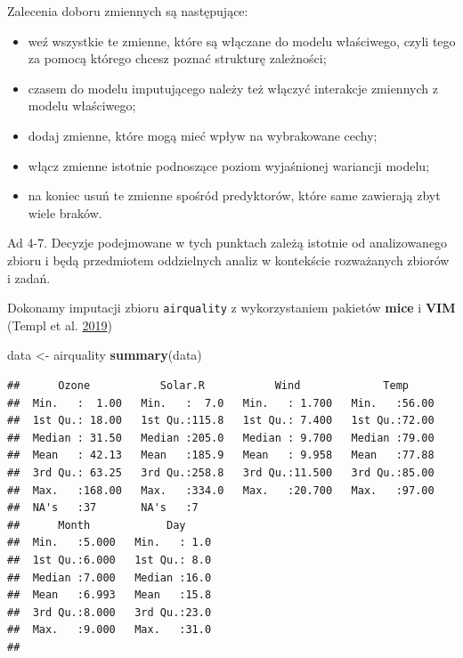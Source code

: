 \documentclass[]{book}
\newenvironment{Shaded}{\begin{snugshade}}{\end{snugshade}}
\newcommand{\KeywordTok}[1]{\textcolor[rgb]{0.13,0.29,0.53}{\textbf{#1}}}
\newcommand{\NormalTok}[1]{#1}
\newcommand{\StringTok}[1]{\textcolor[rgb]{0.31,0.60,0.02}{#1}}
\providecommand{\tightlist}{%
  \setlength{\itemsep}{0pt}\setlength{\parskip}{0pt}}
\theoremstyle{plain}
\theoremstyle{definition}
\theoremstyle{definition}
\theoremstyle{definition}
\theoremstyle{definition}
\theoremstyle{remark}
\let\BeginKnitrBlock\begin \let\EndKnitrBlock\end
\begin{document}
Zalecenia doboru zmiennych są następujące:

\begin{itemize}
\tightlist
\item
  weź wszystkie te zmienne, które są włączane do modelu właściwego, czyli tego za pomocą którego chcesz poznać strukturę zależności;
\item
  czasem do modelu imputującego należy też włączyć interakcje zmiennych z modelu właściwego;
\item
  dodaj zmienne, które mogą mieć wpływ na wybrakowane cechy;
\item
  włącz zmienne istotnie podnoszące poziom wyjaśnionej wariancji modelu;
\item
  na koniec usuń te zmienne spośród predyktorów, które same zawierają zbyt wiele braków.
\end{itemize}

Ad 4-7. Decyzje podejmowane w tych punktach zależą istotnie od analizowanego zbioru i będą przedmiotem oddzielnych analiz w kontekście rozważanych zbiorów i zadań.

\BeginKnitrBlock{example}
\protect\hypertarget{exm:przyk21}{}{\label{exm:przyk21} }Dokonamy imputacji zbioru \texttt{airquality} z wykorzystaniem pakietów \textbf{mice} i \textbf{VIM} (Templ et al. \protect\hyperlink{ref-R-VIM}{2019})
\EndKnitrBlock{example}

\begin{Shaded}
\begin{Highlighting}[]
\NormalTok{data <-}\StringTok{ }\NormalTok{airquality}
\KeywordTok{summary}\NormalTok{(data)}
\end{Highlighting}
\end{Shaded}

\begin{verbatim}
##      Ozone           Solar.R           Wind             Temp      
##  Min.   :  1.00   Min.   :  7.0   Min.   : 1.700   Min.   :56.00  
##  1st Qu.: 18.00   1st Qu.:115.8   1st Qu.: 7.400   1st Qu.:72.00  
##  Median : 31.50   Median :205.0   Median : 9.700   Median :79.00  
##  Mean   : 42.13   Mean   :185.9   Mean   : 9.958   Mean   :77.88  
##  3rd Qu.: 63.25   3rd Qu.:258.8   3rd Qu.:11.500   3rd Qu.:85.00  
##  Max.   :168.00   Max.   :334.0   Max.   :20.700   Max.   :97.00  
##  NA's   :37       NA's   :7                                       
##      Month            Day      
##  Min.   :5.000   Min.   : 1.0  
##  1st Qu.:6.000   1st Qu.: 8.0  
##  Median :7.000   Median :16.0  
##  Mean   :6.993   Mean   :15.8  
##  3rd Qu.:8.000   3rd Qu.:23.0  
##  Max.   :9.000   Max.   :31.0  
## 
\end{verbatim}
\end{document}

